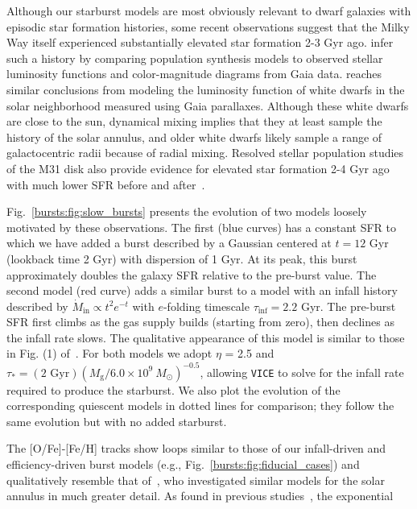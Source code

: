 Although our starburst models are most obviously relevant to dwarf galaxies 
with episodic star formation histories, some recent observations suggest that 
the Milky Way itself experienced substantially elevated star formation 2-3 Gyr 
ago. \citet{Mor2019} infer such a history by comparing population synthesis 
models to observed stellar luminosity functions and color-magnitude diagrams 
from Gaia data. \citet{Isern2019} reaches similar conclusions from modeling the 
luminosity function of white dwarfs in the solar neighborhood measured using 
Gaia parallaxes. Although these white dwarfs are close to the sun, dynamical 
mixing implies that they at least sample the history of the solar annulus, 
and older white dwarfs likely sample a range of galactocentric radii because of 
radial mixing. Resolved stellar population studies of the M31 disk also provide 
evidence for elevated star formation 2-4 Gyr ago with much lower SFR before 
and after~\citep[][Figs. 22-23]{Williams2017}. 
\par 
Fig.~\ref{bursts:fig:slow_bursts} presents the evolution of two models loosely 
motivated by these observations. The first (blue curves) has a constant SFR to 
which we have added a burst described by a Gaussian centered at $t = 12$ Gyr 
(lookback time 2 Gyr) with dispersion of 1 Gyr. At its peak, this burst 
approximately doubles the galaxy SFR relative to the pre-burst value. The 
second model (red curve) adds a similar burst to a model with an infall 
history described by $\dot{M}_\text{in} \propto t^2e^{-t}$ with $e$-folding 
timescale $\tau_\text{inf} = 2.2$ Gyr. The pre-burst SFR first climbs as the 
gas supply builds (starting from zero), then declines as the infall rate slows. 
The qualitative appearance of this model is similar to those in Fig. (1) 
of~\citet{Isern2019}. For both models we adopt $\eta$ = 2.5 and 
$\tau_* = (\text{2 Gyr})(M_\text{g}/6.0\times10^9\ M_\odot)^{-0.5}$, allowing 
\texttt{VICE} to solve for the infall rate required to produce the starburst. 
We also plot the evolution of the corresponding quiescent models in dotted 
lines for comparison; they follow the same evolution but with no added 
starburst. 
\par 
The [O/Fe]-[Fe/H] tracks show loops similar to those of our infall-driven and 
efficiency-driven burst models (e.g., Fig.~\ref{bursts:fig:fiducial_cases})
and qualitatively resemble that of~\citet{Spitoni2019}, who investigated 
similar models for the solar annulus in much greater detail. 
As found 
in previous studies~\citep{Andrews2017, Weinberg2017b}, the exponential 
